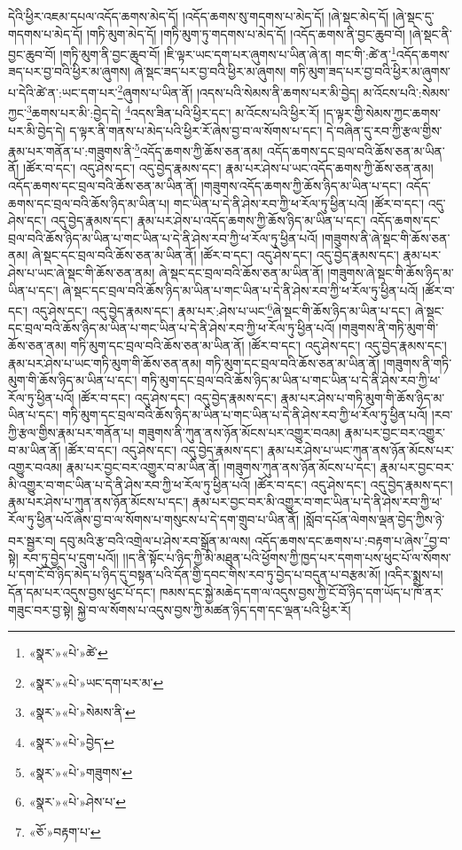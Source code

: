 དེའི་ཕྱིར་འཇམ་དཔལ་འདོད་ཆགས་མེད་དོ། །འདོད་ཆགས་སུ་གདགས་པ་མེད་དོ། །ཞེ་སྡང་མེད་དོ། །ཞེ་སྡང་དུ་གདགས་པ་མེད་དོ། །གཏི་མུག་མེད་དོ། །གཏི་མུག་ཏུ་གདགས་པ་མེད་དོ། །འདོད་ཆགས་ནི་བྱང་ཆུབ་བོ། །ཞེ་སྡང་ནི་བྱང་ཆུབ་བོ། །གཏི་མུག་ནི་བྱང་ཆུབ་བོ། །ཇི་ལྟར་ཡང་དག་པར་ཞུགས་པ་ཡིན་ཞེ་ན། གང་གི་:ཚེ་ན་\footnote{«སྣར་»«པེ་»ཚེ་}འདོད་ཆགས་ཟད་པར་བྱ་བའི་ཕྱིར་མ་ཞུགས། ཞེ་སྡང་ཟད་པར་བྱ་བའི་ཕྱིར་མ་ཞུགས། གཏི་མུག་ཟད་པར་བྱ་བའི་ཕྱིར་མ་ཞུགས་པ་དེའི་ཚེ་ན་:ཡང་དག་པར་\footnote{«སྣར་»«པེ་»ཡང་དག་པར་མ་}ཞུགས་པ་ཡིན་ནོ། །འདས་པའི་སེམས་ནི་ཆགས་པར་མི་བྱེད། མ་འོངས་པའི་:སེམས་ཀྱང་\footnote{«སྣར་»«པེ་»སེམས་ནི་}ཆགས་པར་མི་:བྱེད་དེ། \footnote{«སྣར་»«པེ་»བྱེད་}འདས་ཟིན་པའི་ཕྱིར་དང་། མ་འོངས་པའི་ཕྱིར་རོ། །ད་ལྟར་གྱི་སེམས་ཀྱང་ཆགས་པར་མི་བྱེད་དེ། ད་ལྟར་ནི་གནས་པ་མེད་པའི་ཕྱིར་རོ་ཞེས་བྱ་བ་ལ་སོགས་པ་དང་། དེ་བཞིན་དུ་རབ་ཀྱི་རྩལ་གྱིས་རྣམ་པར་གནོན་པ་:གཟུགས་ནི་\footnote{«སྣར་»«པེ་»གཟུགས་}འདོད་ཆགས་ཀྱི་ཆོས་ཅན་ནམ། འདོད་ཆགས་དང་བྲལ་བའི་ཆོས་ཅན་མ་ཡིན་ནོ། །ཚོར་བ་དང་། འདུ་ཤེས་དང་། འདུ་བྱེད་རྣམས་དང་། རྣམ་པར་ཤེས་པ་ཡང་འདོད་ཆགས་ཀྱི་ཆོས་ཅན་ནམ། འདོད་ཆགས་དང་བྲལ་བའི་ཆོས་ཅན་མ་ཡིན་ནོ། །གཟུགས་འདོད་ཆགས་ཀྱི་ཆོས་ཉིད་མ་ཡིན་པ་དང་། འདོད་ཆགས་དང་བྲལ་བའི་ཆོས་ཉིད་མ་ཡིན་པ། གང་ཡིན་པ་དེ་ནི་ཤེས་རབ་ཀྱི་ཕ་རོལ་ཏུ་ཕྱིན་པའོ། །ཚོར་བ་དང་། འདུ་ཤེས་དང་། འདུ་བྱེད་རྣམས་དང་། རྣམ་པར་ཤེས་པ་འདོད་ཆགས་ཀྱི་ཆོས་ཉིད་མ་ཡིན་པ་དང་། འདོད་ཆགས་དང་བྲལ་བའི་ཆོས་ཉིད་མ་ཡིན་པ་གང་ཡིན་པ་དེ་ནི་ཤེས་རབ་ཀྱི་ཕ་རོལ་ཏུ་ཕྱིན་པའོ། །གཟུགས་ནི་ཞེ་སྡང་གི་ཆོས་ཅན་ནམ། ཞེ་སྡང་དང་བྲལ་བའི་ཆོས་ཅན་མ་ཡིན་ནོ། །ཚོར་བ་དང་། འདུ་ཤེས་དང་། འདུ་བྱེད་རྣམས་དང་། རྣམ་པར་ཤེས་པ་ཡང་ཞེ་སྡང་གི་ཆོས་ཅན་ནམ། ཞེ་སྡང་དང་བྲལ་བའི་ཆོས་ཅན་མ་ཡིན་ནོ། །གཟུགས་ཞེ་སྡང་གི་ཆོས་ཉིད་མ་ཡིན་པ་དང་། ཞེ་སྡང་དང་བྲལ་བའི་ཆོས་ཉིད་མ་ཡིན་པ་གང་ཡིན་པ་དེ་ནི་ཤེས་རབ་ཀྱི་ཕ་རོལ་ཏུ་ཕྱིན་པའོ། །ཚོར་བ་དང་། འདུ་ཤེས་དང་། འདུ་བྱེད་རྣམས་དང་། རྣམ་པར་:ཤེས་པ་ཡང་\footnote{«སྣར་»«པེ་»ཤེས་པ་}ཞེ་སྡང་གི་ཆོས་ཉིད་མ་ཡིན་པ་དང་། ཞེ་སྡང་དང་བྲལ་བའི་ཆོས་ཉིད་མ་ཡིན་པ་གང་ཡིན་པ་དེ་ནི་ཤེས་རབ་ཀྱི་ཕ་རོལ་ཏུ་ཕྱིན་པའོ། །གཟུགས་ནི་གཏི་མུག་གི་ཆོས་ཅན་ནམ། གཏི་མུག་དང་བྲལ་བའི་ཆོས་ཅན་མ་ཡིན་ནོ། །ཚོར་བ་དང་། འདུ་ཤེས་དང་། འདུ་བྱེད་རྣམས་དང་། རྣམ་པར་ཤེས་པ་ཡང་གཏི་མུག་གི་ཆོས་ཅན་ནམ། གཏི་མུག་དང་བྲལ་བའི་ཆོས་ཅན་མ་ཡིན་ནོ། །གཟུགས་ནི་གཏི་མུག་གི་ཆོས་ཉིད་མ་ཡིན་པ་དང་། གཏི་མུག་དང་བྲལ་བའི་ཆོས་ཉིད་མ་ཡིན་པ་གང་ཡིན་པ་དེ་ནི་ཤེས་རབ་ཀྱི་ཕ་རོལ་ཏུ་ཕྱིན་པའོ། །ཚོར་བ་དང་། འདུ་ཤེས་དང་། འདུ་བྱེད་རྣམས་དང་། རྣམ་པར་ཤེས་པ་གཏི་མུག་གི་ཆོས་ཉིད་མ་ཡིན་པ་དང་། གཏི་མུག་དང་བྲལ་བའི་ཆོས་ཉིད་མ་ཡིན་པ་གང་ཡིན་པ་དེ་ནི་ཤེས་རབ་ཀྱི་ཕ་རོལ་ཏུ་ཕྱིན་པའོ། །རབ་ཀྱི་རྩལ་གྱིས་རྣམ་པར་གནོན་པ། གཟུགས་ནི་ཀུན་ནས་ཉོན་མོངས་པར་འགྱུར་བའམ། རྣམ་པར་བྱང་བར་འགྱུར་བ་མ་ཡིན་ནོ། །ཚོར་བ་དང་། འདུ་ཤེས་དང་། འདུ་བྱེད་རྣམས་དང་། རྣམ་པར་ཤེས་པ་ཡང་ཀུན་ནས་ཉོན་མོངས་པར་འགྱུར་བའམ། རྣམ་པར་བྱང་བར་འགྱུར་བ་མ་ཡིན་ནོ། །གཟུགས་ཀུན་ནས་ཉོན་མོངས་པ་དང་། རྣམ་པར་བྱང་བར་མི་འགྱུར་བ་གང་ཡིན་པ་དེ་ནི་ཤེས་རབ་ཀྱི་ཕ་རོལ་ཏུ་ཕྱིན་པའོ། །ཚོར་བ་དང་། འདུ་ཤེས་དང་། འདུ་བྱེད་རྣམས་དང་། རྣམ་པར་ཤེས་པ་ཀུན་ནས་ཉོན་མོངས་པ་དང་། རྣམ་པར་བྱང་བར་མི་འགྱུར་བ་གང་ཡིན་པ་དེ་ནི་ཤེས་རབ་ཀྱི་ཕ་རོལ་ཏུ་ཕྱིན་པའོ་ཞེས་བྱ་བ་ལ་སོགས་པ་གསུངས་པ་དེ་དག་གྲུབ་པ་ཡིན་ནོ། །སློབ་དཔོན་ལེགས་ལྡན་བྱེད་ཀྱིས་ཉེ་བར་སྦྱར་བ། དབུ་མའི་རྩ་བའི་འགྲེལ་པ་ཤེས་རབ་སྒྲོན་མ་ལས། འདོད་ཆགས་དང་ཆགས་པ་:བརྟག་པ་ཞེས་\footnote{«ཅོ་»བརྟག་པ་}བྱ་བ་སྟེ། རབ་ཏུ་བྱེད་པ་དྲུག་པའོ།། །།ད་ནི་སྟོང་པ་ཉིད་ཀྱི་མི་མཐུན་པའི་ཕྱོགས་ཀྱི་ཁྱད་པར་དགག་པས་ཕུང་པོ་ལ་སོགས་པ་དག་ངོ་བོ་ཉིད་མེད་པ་ཉིད་དུ་བསྟན་པའི་དོན་གྱི་དབང་གིས་རབ་ཏུ་བྱེད་པ་བདུན་པ་བརྩམ་མོ། །འདིར་སྨྲས་པ། དོན་དམ་པར་འདུས་བྱས་ཕུང་པོ་དང་། ཁམས་དང་སྐྱེ་མཆེད་དག་ལ་འདུས་བྱས་ཀྱི་ངོ་བོ་ཉིད་དག་ཡོད་པ་ཁོ་ནར་གཟུང་བར་བྱ་སྟེ། སྐྱེ་བ་ལ་སོགས་པ་འདུས་བྱས་ཀྱི་མཚན་ཉིད་དག་དང་ལྡན་པའི་ཕྱིར་རོ། 